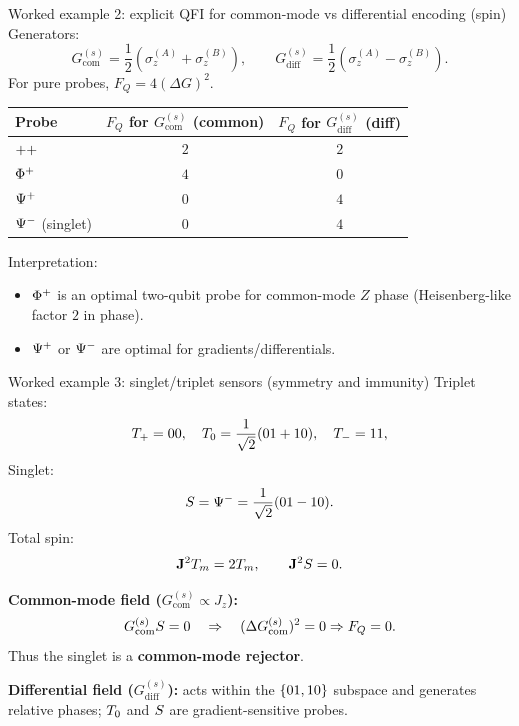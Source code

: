 \documentclass[aspectratio=169]{beamer}
\newcommand{\sA}[1]{\sigma_{#1}^{(A)}}
\newcommand{\sB}[1]{\sigma_{#1}^{(B)}}
\newcommand{\Jop}[1]{J_{#1}}
\newcommand{\GcomS}{G_{\mathrm{com}}^{(s)}}
\newcommand{\GdiffS}{G_{\mathrm{diff}}^{(s)}}
\begin{document}
\begin{frame}{Worked example 2: explicit QFI for common-mode vs differential encoding (spin)}
\small
Generators:
\[
\GcomS=\frac12(\sA{z}+\sB{z}),
\qquad
\GdiffS=\frac12(\sA{z}-\sB{z}).
\]
For pure probes, $F_Q=4(\Delta G)^2$.

\vspace{0.35em}
\begin{center}
\small
\begin{tabular}{lcc}
\toprule
Probe & $F_Q$ for $\GcomS$ (common) & $F_Q$ for $\GdiffS$ (diff) \\
\midrule
$\relax{+}\relax{+}$ & $2$ & $2$ \\
$\relax{\Phi^+}$ & $4$ & $0$ \\
$\relax{\Psi^+}$ & $0$ & $4$ \\
$\relax{\Psi^-}$ (singlet) & $0$ & $4$ \\
\bottomrule
\end{tabular}
\end{center}

\vspace{0.25em}
Interpretation:
\begin{itemize}
\item $\relax{\Phi^+}$ is an optimal two-qubit probe for common-mode $Z$ phase (Heisenberg-like factor $2$ in phase).
\item $\relax{\Psi^+}$ or $\relax{\Psi^-}$ are optimal for gradients/differentials.
\end{itemize}
\end{frame}

\begin{frame}{Worked example 3: singlet/triplet sensors (symmetry and immunity)}
\small
Triplet states:
\[
\relax{T_+}=\relax{00},\quad \relax{T_0}=\frac{1}{\sqrt2}(\relax{01}+\relax{10}),\quad \relax{T_-}=\relax{11},
\]
Singlet:
\[
\relax{S}=\relax{\Psi^-}=\frac{1}{\sqrt2}(\relax{01}-\relax{10}).
\]
Total spin:
\[
\mathbf{J}^2\relax{T_m}=2\relax{T_m},\qquad \mathbf{J}^2\relax{S}=0.
\]

\vspace{0.35em}
\textbf{Common-mode field ($\GcomS \propto \Jop{z}$):}
\[
\GcomS \ket{S}=0 \quad\Rightarrow\quad (\Delta \GcomS)^2=0 \Rightarrow F_Q=0.
\]
Thus the singlet is a \textbf{common-mode rejector}.

\vspace{0.35em}
\textbf{Differential field ($\GdiffS$):}
acts within the $\{\relax{01},\relax{10}\}$ subspace and generates relative phases; $\relax{T_0}$ and $\relax{S}$ are gradient-sensitive probes.
\end{frame}
\end{document}
